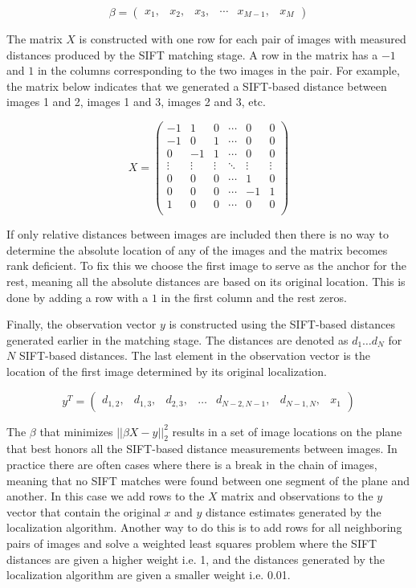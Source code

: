 \documentclass[10pt,twocolumn,letterpaper]{article}
\begin{document}

\[\beta =
\begin{pmatrix}
  x_1, & x_2, & x_3, & \cdots & x_{M-1}, & x_M
\end{pmatrix}
\]

The matrix $X$ is constructed with one row for each pair of images
with measured distances produced by the SIFT matching stage. A row in
the matrix has a $-1$ and $1$ in the columns corresponding to the two
images in the pair. For example, the matrix below indicates that we
generated a SIFT-based distance between images 1 and 2, images 1 and
3, images 2 and 3, etc.

\[
X =
\begin{pmatrix}
  -1 & 1 & 0 & \cdots & 0 & 0\\
  -1 & 0 & 1 & \cdots & 0 & 0\\
  0 & -1 & 1 & \cdots & 0 & 0\\
  \vdots  & \vdots & \vdots & \ddots & \vdots  & \vdots\\
  0 & 0 & 0 & \cdots & 1 & 0 \\
  0 & 0 & 0 & \cdots & -1 & 1 \\
  1 & 0 & 0 & \cdots & 0 & 0 \\
\end{pmatrix}
\]

If only relative distances between images are included then there is
no way to determine the absolute location of any of the images and the
matrix becomes rank deficient. To fix this we choose the first image
to serve as the anchor for the rest, meaning all the absolute
distances are based on its original location. This is done by adding a
row with a $1$ in the first column and the rest zeros.

Finally, the observation vector $y$ is constructed using the
SIFT-based distances generated earlier in the matching stage. The
distances are denoted as $d_1 \dots d_N$ for $N$ SIFT-based
distances. The last element in the observation vector is the location
of the first image determined by its original localization.

\[
y^T =
\begin{pmatrix}
  d_{1,2}, &d_{1,3}, &d_{2,3}, &\hdots &d_{N-2,N-1}, &d_{N-1,N}, &x_1
\end{pmatrix}
\]

The $\beta$ that minimizes $||\beta X - y||_2^2$ results in a set of
image locations on the plane that best honors all the SIFT-based
distance measurements between images. In practice there are often
cases where there is a break in the chain of images, meaning that no
SIFT matches were found between one segment of the plane and
another. In this case we add rows to the $X$ matrix and observations
to the $y$ vector that contain the original $x$ and $y$ distance
estimates generated by the localization algorithm. Another way to do
this is to add rows for all neighboring pairs of images and solve a
weighted least squares problem where the SIFT distances are given a
higher weight i.e. 1, and the distances generated by the localization
algorithm are given a smaller weight i.e. 0.01.
\end{document}
